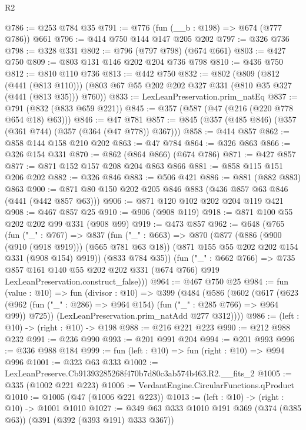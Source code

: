 \begin{lexlean}{R2}
\begin{coremodule}
@786 := @253 @784 @35
@791 := @776 (fun (__b : @198) => @674 (@777 @786)) @661
@796 := @414 @750 @144 @147 @205 @202
@797 := @326 @736
@798 := @328 @331
@802 := @796 (@797 @798) (@674 @661)
@803 := @427 @750
@809 := @803 @131 @146 @202 @204 @736 @798
@810 := @436 @750
@812 := @810 @110 @736
@813 := @442 @750
@832 := @802
    (@809
      (@812 (@441 (@813 @110)))
      (@803 @67 @55 @202 @202 @327 @331 (@810 @35 @327 (@441 (@813 @35))) @760))
@833 := LexLeanPreservation.prim_natEq
@837 := @791 (@832 (@833 @659 @221))
@845 := @357 (@587 (@47 (@216 (@220 @778 @654 @18) @63)))
@846 := @47 @781
@857 := @845 (@357 (@485 @846) (@357 (@361 @744) (@357 (@364 (@47 @778)) @367)))
@858 := @414 @857
@862 := @858 @144 @158 @210 @202
@863 := @47 @784
@864 := @326 @863
@866 := @326 @154 @331
@870 := @862 (@864 @866) (@674 @786)
@871 := @427 @857
@877 := @871 @152 @157 @208 @204 @863 @866
@881 := @858 @115 @151 @206 @202
@882 := @326 @846
@883 := @506 @421
@886 := @881 (@882 @883) @863
@900 := @871 @80 @150 @202 @205 @846 @883 (@436 @857 @63 @846 (@441 (@442 @857 @63)))
@906 := @871 @120 @102 @202 @204 @119 @421
@908 := @467 @857 @25
@910 := @906 (@908 @119)
@918 := @871 @100 @55 @202 @202 @99 @331 (@908 @99)
@919 := @473 @857
@962 := @648
    (@765
      (fun ("_" : @767) =>
      @837
        (fun ("_" : @663) =>
        @870
          (@877
            (@886 (@900 (@910 (@918 @919))) (@565 @781 @63 @18))
            (@871 @155 @55 @202 @202 @154 @331 (@908 @154) @919))
          (@833 @784 @35))
        (fun ("_" : @662 @766) =>
        @735
          @857
          @161
          @140
          @55
          @202
          @202
          @331
          (@674 @766)
          @919
          LexLeanPreservation.construct_false)))
@964 := @467 @750 @25
@984 := fun (value : @10) =>
  fun (divisor : @10) =>
  @399
    (@484
      (@586
        (@602
          (@617
            (@623 (@962 (fun ("_" : @286) => @964 @154) (fun ("_" : @285 @766) => @964 @99)) @725))
          (LexLeanPreservation.prim_natAdd @277 @312))))
@986 := (left : @10) -> (right : @10) -> @198
@988 := @216 @221 @223
@990 := @212 @988 @232
@991 := @236 @990
@993 := @201 @991 @204
@994 := @201 @993
@996 := @336 @988 @184
@999 := fun (left : @10) => fun (right : @10) => @994 @996
@1001 := @323 @63 @333
@1002 := LexLeanPreserve.Cb91393285268f470b7d80c3ab574b463.R2.__fits_2
@1005 := @335 (@1002 @221 @223)
@1006 := VerdantEngine.CircularFunctions.qProduct
@1010 := @1005 (@47 (@1006 @221 @223))
@1013 := (left : @10) -> (right : @10) -> @1001 @1010
@1027 := @349 @63 @333 @1010 @191 @369 (@374 (@385 @63)) (@391 (@392 (@393 @191) @333 @367))

\end{coremodule}
\end{lexlean}
